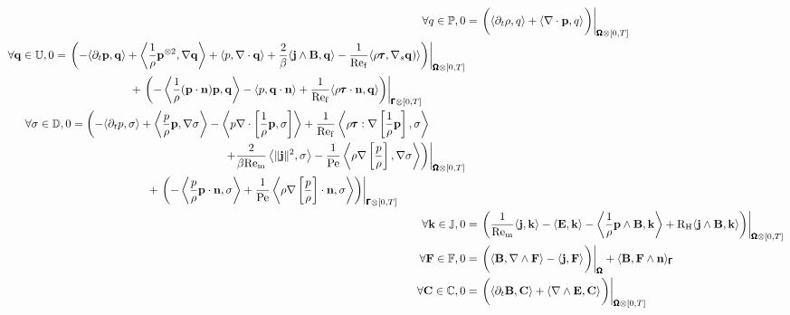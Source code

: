     \begin{align}
        \forall q \in \bbP,  0  &=  \left.\left(\langle\partial_{t}\rho, q\rangle + \langle\nabla\cdot\bfp, q\rangle\tall\right)\right|_{\bfOmega\otimes[0, T]}  \\
        \begin{split}
            \forall \bfq \in \bbU,  0  &=  \left.\left(- \langle\partial_{t}\bfp, \bfq\rangle + \left\langle\frac{1}{\rho}\bfp^{\otimes 2}, \nabla\bfq\right\rangle + \langle p, \nabla\cdot\bfq\rangle + \frac{2}{\beta}\langle\bfj\wedge\bfB, \bfq\rangle - \frac{1}{\rmRef}\langle\rho\bftau, \nabla_{s}\bfq)\rangle\right)\right|_{\bfOmega\otimes[0, T]}  \\
            &\;\;\;\;\;\;\;\;\;\;\;\;\;\;\;\;\;\;\;\;\;\;\;\;  + \left.\left(- \left\langle\frac{1}{\rho}(\bfp\cdot\bfn)\bfp, \bfq\right\rangle - \langle p, \bfq\cdot\bfn\rangle + \frac{1}{\rmRef}\langle\rho\bftau\cdot\bfn, \bfq\rangle\right)\right|_{\bfGamma\otimes[0, T]}
        \end{split}  \\
        \begin{split}
            \forall \sigma \in \bbD,  0  &=  \left(- \langle\partial_{t}p, \sigma\rangle + \left\langle\frac{p}{\rho}\bfp, \nabla\sigma\right\rangle - \left\langle p\nabla\cdot\left[\frac{1}{\rho}{\bfp}, \sigma\right]\right\rangle + \frac{1}{\rmRef}\left\langle\rho\bftau:\nabla\left[\frac{1}{\rho}\bfp\right], \sigma\right\rangle\right.  \\
            &\;\;\;\;\;\;\;\;\;\;\;\;\;\;\;\;\;\;\;\;\;\;\;\;\;\;\;\;\;\;\;\;\;\;\;\;\;\;\;\;\;\;\;\;\;\;\;\;\left.\left.+ \frac{2}{\beta\rmRem}\left\langle\|\bfj\|^{2}, \sigma\right\rangle - \frac{1}{\rmPe}\left\langle\rho\nabla\left[\frac{p}{\rho}\right], \nabla\sigma\right\rangle\right)\right|_{\bfOmega\otimes[0, T]}  \\
            &\;\;\;\;\;\;\;\;\;\;\;\;\;\;\;\;\;\;\;\;\;\;\;\;  + \left.\left(- \left\langle\frac{p}{\rho}\bfp\cdot\bfn, \sigma\right\rangle + \frac{1}{\rmPe}\left\langle\rho\nabla\left[\frac{p}{\rho}\right]\cdot\bfn, \sigma\right\rangle\right)\right|_{\bfGamma\otimes[0, T]}
        \end{split}  \\
        \forall \bfk \in \bbJ,  0  &=  \left.\left(\frac{1}{\rmRem}\langle\bfj, \bfk\rangle - \langle\bfE, \bfk\rangle - \left\langle\frac{1}{\rho}\bfp\wedge\bfB, \bfk\right\rangle + \rmRH\langle\bfj\wedge\bfB, \bfk\rangle\right)\right|_{\bfOmega\otimes[0, T]}  \\
        \forall \bfF \in \bbF,  0  &=  \left.\left(\langle\bfB, \nabla\wedge\bfF\rangle - \langle\bfj, \bfF\rangle\tall\right)\right|_{\bfOmega} + \langle\bfB, \bfF\wedge\bfn\rangle_{\bfGamma}  \\
        \forall \bfC \in \bbC,  0  &=  \left.\left(\langle\partial_{t}\bfB, \bfC\rangle + \langle\nabla\wedge\bfE, \bfC\rangle\tall\right)\right|_{\bfOmega\otimes[0, T]}
    \end{align}
